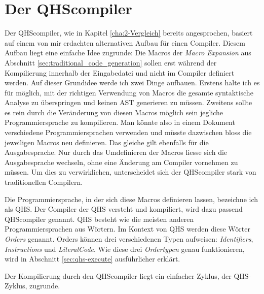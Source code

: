 \chapter{Der QHScompiler} \label{cha:4-QHS_Compiler}
Der QHScompiler, wie in Kapitel \ref{cha:2-Vergleich} bereits angesprochen, basiert auf einem von mir erdachten alternativen Aufbau für einen Compiler. Diesem Aufbau liegt eine einfache Idee zugrunde:
Die Macros der \textit{Macro Expansion} aus Abschnitt \ref{sec:traditional_code_generation} sollen erst während der Kompilierung innerhalb der Eingabedatei und nicht im Compiler definiert werden. 
Auf dieser Grundidee werde ich zwei Dinge aufbauen. Erstens halte ich es für möglich, mit der richtigen Verwendung von Macros die gesamte syntaktische Analyse zu überspringen und keinen AST generieren zu müssen.
Zweitens sollte es rein durch die Veränderung von diesen Macros möglich sein jegliche Programmiersprache zu kompilieren. Man könnte also in einem Dokument verschiedene Programmiersprachen verwenden und
müsste dazwischen bloss die jeweiligen Macros neu definieren. Das gleiche gilt ebenfalls für die Ausgabesprache.
Nur durch das Umdefinieren der Macros liesse sich die Ausgabesprache wechseln, ohne eine Änderung am Compiler vornehmen zu müssen.
Um dies zu verwirklichen, unterscheidet sich der QHScompiler stark von traditionellen Compilern.

Die Programmiersprache, in der sich diese Macros definieren lassen, bezeichne ich als QHS. Der Compiler der QHS versteht und kompiliert, wird dazu passend QHScompiler genannt.
QHS besteht wie die meisten anderen Programmiersprachen aus Wörtern. Im Kontext von QHS werden diese Wörter \textit{Orders} genannt.
Orders können drei verschiedenen Typen aufweisen: \textit{Identifiers}, \textit{Instructions} und \textit{LiteralCode}.
Wie diese drei \textit{Ordertypen} genau funktionieren, wird in Abschnitt \ref{sec:qhs-execute} ausführlicher erklärt.

Der Kompilierung durch den QHScompiler liegt ein einfacher Zyklus, der QHS-Zyklus, zugrunde.

